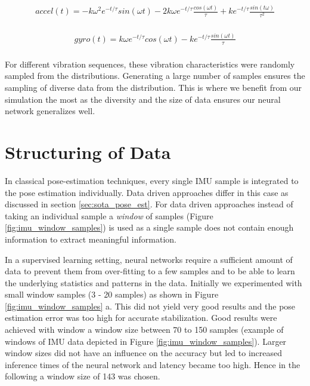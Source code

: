 \begin{equation}
  \label{eqn:vib_disp_acc}
  \begin{aligned}
    accel(t) = -k \omega^2 e^{-t / \tau} sin(\omega t)
        - 2k \omega e^{-t / \tau} \frac{cos(\omega t)}{\tau}
        + k e^{-t / \tau} \frac{sin(t \omega)}{\tau^2}
         \\
  \end{aligned}
\end{equation}

\begin{equation}
  \label{eqn:vib_disp_gyro}
  \begin{aligned}
    gyro(t) = k \omega e^{-t / \tau} cos(\omega t )
        - k  e^{-t / \tau} \frac{sin(\omega t)}{\tau}
         \\
  \end{aligned}
\end{equation}

For different vibration sequences, these vibration characteristics were randomly sampled from the distributions. Generating a large number of samples ensures the sampling of diverse data from the distribution. This is where we benefit from our simulation the most as the diversity and the size of data ensures our neural network generalizes well. 

\section{Structuring of Data}
\label{sec:data_structure}
In classical pose-estimation techniques, every single IMU sample is integrated to the pose estimation individually. Data driven approaches differ in this case as discussed in section \ref{sec:sota_pose_est}. For data driven approaches instead of taking an individual sample a \textit{window} of samples (Figure \ref{fig:imu_window_samples}) is used as a single sample does not contain enough information to extract meaningful information. 

In a supervised learning setting, neural networks require a sufficient amount of data to prevent them from over-fitting to a few samples and to be able to learn the underlying statistics and patterns in the data. Initially we experimented with small window samples (3 - 20 samples) as shown in Figure \ref{fig:imu_window_samples} a. This did not yield very good results and the pose estimation error was too high for accurate stabilization. Good results were achieved with window a window size between 70 to 150 samples (example of windows of IMU data depicted in Figure \ref{fig:imu_window_samples}). Larger window sizes did not have an influence on the accuracy but led to increased inference times of the neural network and latency became too high. Hence in the following a window size of 143 was chosen.

